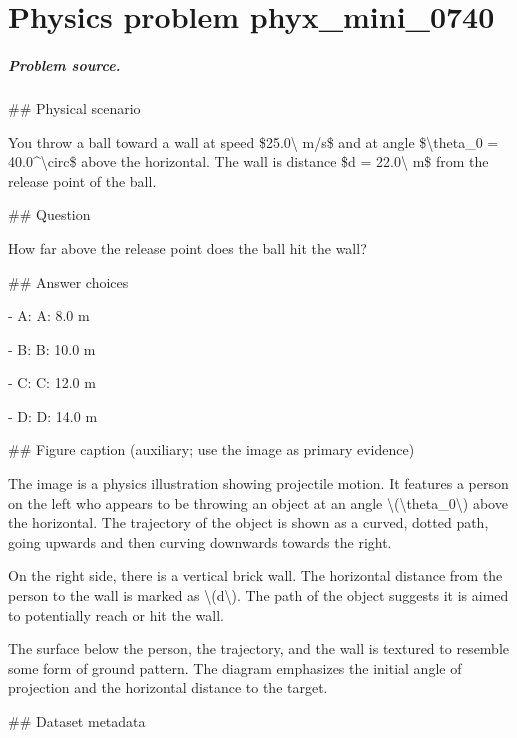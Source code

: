 
\chapter{Physics problem phyx\_mini\_0740}
\label{ch:PhyXMiniProblems_problem_phyx_mini_0740}

\paragraph{Problem source.}
\#\# Physical scenario

You throw a ball toward a wall at speed \$25.0\textbackslash{} m/s\$ and at angle \$\textbackslash{}theta\_0 = 40.0\textasciicircum{}\textbackslash{}circ\$ above the horizontal. The wall is distance \$d = 22.0\textbackslash{} m\$ from the release point of the ball.

\#\# Question

How far above the release point does the ball hit the wall?

\#\# Answer choices

- A: A: 8.0 m

- B: B: 10.0 m

- C: C: 12.0 m

- D: D: 14.0 m

\#\# Figure caption (auxiliary; use the image as primary evidence)

The image is a physics illustration showing projectile motion. It features a person on the left who appears to be throwing an object at an angle \textbackslash{}(\textbackslash{}theta\_0\textbackslash{}) above the horizontal. The trajectory of the object is shown as a curved, dotted path, going upwards and then curving downwards towards the right.

On the right side, there is a vertical brick wall. The horizontal distance from the person to the wall is marked as \textbackslash{}(d\textbackslash{}). The path of the object suggests it is aimed to potentially reach or hit the wall.

The surface below the person, the trajectory, and the wall is textured to resemble some form of ground pattern. The diagram emphasizes the initial angle of projection and the horizontal distance to the target.

\#\# Dataset metadata

